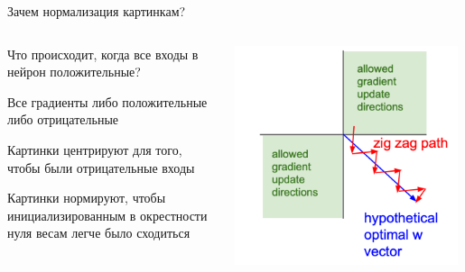 \documentclass[notes,12pt, aspectratio=169]{beamer}
\newenvironment{wideitemize}{\itemize\addtolength{\itemsep}{10pt}}{\enditemize}
\begin{document}
\begin{frame}{Зачем нормализация картинкам?}
\begin{columns}
	\begin{column}{0.6\textwidth}
			\begin{wideitemize}
			\item \alert{Что происходит, когда все входы в нейрон положительные?}
			\item Все градиенты либо положительные либо отрицательные 
			\item Картинки центрируют для того, чтобы были отрицательные входы
			\item Картинки нормируют, чтобы инициализированным в окрестности нуля весам легче было сходиться
		\end{wideitemize}
	\end{column}
	\hfill
	\begin{column}{0.4\textwidth}
		
		\begin{center}
			\includegraphics[width=0.98\textwidth]{gr_update.png} 
		\end{center} 
	\end{column}
\end{columns}
\end{frame}
\end{document}
